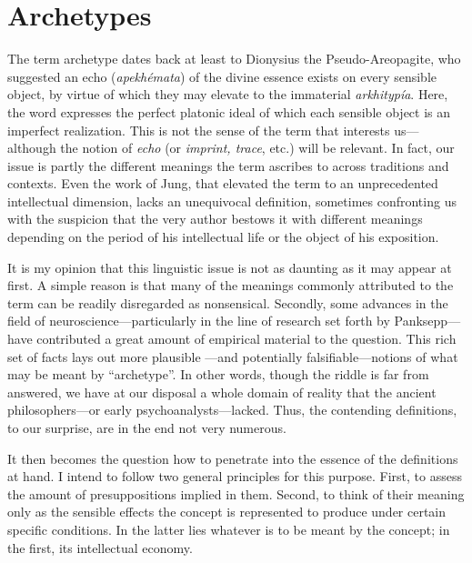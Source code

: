 \documentclass[a4paper]{article}
\begin{document}
    \section{Archetypes}

    The term archetype dates back at least to Dionysius the
    Pseudo-Areopagite, who suggested an echo (\textit{apekhémata}) of the divine
    essence exists on every sensible object, by virtue of which they may elevate
    to the immaterial \textit{arkhitypía}. Here, the word expresses the perfect
    platonic ideal of which each sensible object is an imperfect realization.
    This is not the sense of the term that interests us---although the notion of
    \textit{echo} (or \textit{imprint, trace}, etc.) will be relevant. In fact,
    our issue is partly the different meanings the term ascribes to across
    traditions and contexts. Even the work of Jung, that elevated the term to an
    unprecedented intellectual dimension, lacks an unequivocal definition,
    sometimes confronting us with the suspicion that the very author
    bestows it with different meanings depending on the period of his
    intellectual life or the object of his exposition. 

    It is my opinion that this linguistic issue is not as daunting as it may
    appear at first. A simple reason is that many of the meanings commonly
    attributed to the term can be readily disregarded as nonsensical. Secondly,
    some advances in the field of neuroscience—particularly in the line of
    research set forth by Panksepp—have contributed a great amount of empirical
    material to the question. This rich set of facts lays out more plausible
    —and potentially falsifiable—notions of what may be meant by “archetype”. In
    other words, though the riddle is far from answered, we have at our disposal
    a whole domain of reality that the ancient philosophers—or early
    psychoanalysts—lacked. Thus, the contending definitions, to our surprise,
    are in the end not very numerous. 

    It then becomes the question how to penetrate into the
    essence of the definitions at hand. I intend to follow two general
    principles for this purpose. First, to assess the amount of presuppositions
    implied in them. Second, to think of their meaning only as the sensible
    effects the concept is represented to produce under certain specific
    conditions. In the latter lies whatever is to be meant by the concept; in
    the first, its intellectual economy. 
    
\end{document}
